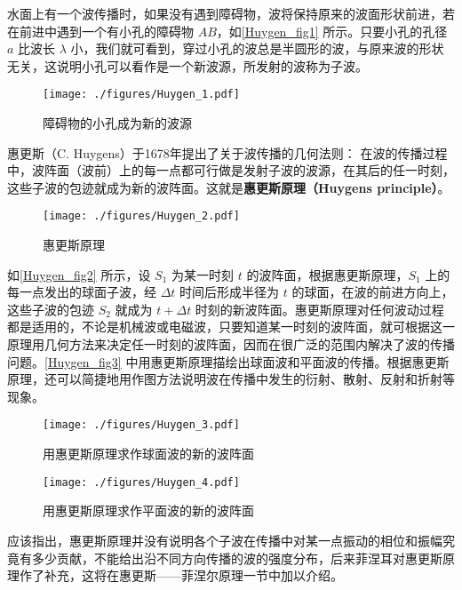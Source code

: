 
水面上有一个波传播时，如果没有遇到障碍物，波将保持原来的波面形状前进，若在前进中遇到一个有小孔的障碍物 $AB$，如\autoref{Huygen_fig1} 所示。只要小孔的孔径 $a $ 比波长 $\lambda$ 小，我们就可看到，穿过小孔的波总是半圆形的波，与原来波的形状无关，这说明小孔可以看作是一个新波源，所发射的波称为子波。

\begin{figure}[ht]
\centering
\texttt{[image: ./figures/Huygen\_1.pdf]}
\caption{障碍物的小孔成为新的波源} \label{Huygen_fig1}
\end{figure}

惠更斯（C. Huygens）于1678年提出了关于波传播的几何法则： 在波的传播过程中，波阵面（波前）上的每一点都可行做是发射子波的波源，在其后的任一时刻，这些子波的包迹就成为新的波阵面。这就是\textbf{惠更斯原理（Huygens principle）}。
\begin{figure}[ht]
\centering
\texttt{[image: ./figures/Huygen\_2.pdf]}
\caption{惠更斯原理} \label{Huygen_fig2}
\end{figure}

如\autoref{Huygen_fig2} 所示，设 $S_1$ 为某一时刻 $t $ 的波阵面，根据惠更斯原理，$S_1$ 上的每一点发出的球面子波，经 $\Delta t$ 时间后形成半径为 $t$ 的球面，在波的前进方向上，这些子波的包迹 $S_2$ 就成为 $t+\Delta t$ 时刻的新波阵面。惠更斯原理对任何波动过程都是适用的，不论是机械波或电磁波，只要知道某一时刻的波阵面，就可根据这一原理用几何方法来决定任一时刻的波阵面，因而在很广泛的范围内解决了波的传播问题。\autoref{Huygen_fig3} 中用惠更斯原理描绘出球面波和平面波的传播。根据惠更斯原理，还可以简捷地用作图方法说明波在传播中发生的衍射、散射、反射和折射等现象。
\begin{figure}[ht]
\centering
\texttt{[image: ./figures/Huygen\_3.pdf]}
\caption{用惠更斯原理求作球面波的新的波阵面} \label{Huygen_fig3}
\end{figure}
\begin{figure}[ht]
\centering
\texttt{[image: ./figures/Huygen\_4.pdf]}
\caption{用惠更斯原理求作平面波的新的波阵面} \label{Huygen_fig4}
\end{figure}
应该指出，惠更斯原理并没有说明各个子波在传播中对某一点振动的相位和振幅究竟有多少贡献，不能给出沿不同方向传播的波的强度分布，后来菲涅耳对惠更斯原理作了补充，这将在惠更斯——菲涅尔原理一节中加以介绍。
